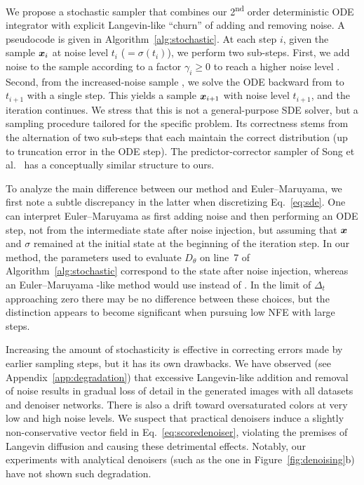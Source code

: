 \documentclass{article}
\begin{document}
We propose a stochastic sampler that combines our 2\textsuperscript{nd} order deterministic ODE integrator with explicit Langevin-like ``churn'' of adding and removing noise.
A pseudocode is given in Algorithm~\ref{alg:stochastic}.
At each step $i$, given the sample $\boldsymbol{x}_i$ at noise level $t_i$ ($=\sigma(t_i)$), we perform two sub-steps.
First, we add noise to the sample according to a factor $\gamma_i\ge0$ to reach a higher noise level .
Second, from the increased-noise sample , we %
solve the ODE backward from  to $t_{i+1}$ with a single step.
This yields a sample $\boldsymbol{x}_{i+1}$ with noise level $t_{i+1}$, and the iteration continues. We stress that this is not a general-purpose SDE solver, but a sampling procedure tailored for the specific problem. Its correctness stems from the alternation of two sub-steps that each maintain the correct distribution (up to truncation error in the ODE step).
{The predictor-corrector sampler of Song et al.~\cite{Song2021sde} has a conceptually similar structure to ours.}

{
To analyze the main difference between our method and Euler--Maruyama, we first note a subtle discrepancy in the latter when discretizing Eq.~\ref{eq:sde}.
One can interpret Euler--Maruyama as first adding noise and then performing an ODE step, not from the intermediate state after noise injection, but assuming that $\boldsymbol{x}$ and $\sigma$ remained at the initial state at the beginning of the iteration step.
In our method, the parameters used to evaluate $D_\theta$ on line~7 of Algorithm~\ref{alg:stochastic} correspond to the state after noise injection, whereas an Euler--Maruyama -like method would use  instead of .
In the limit of $\Delta_t$ approaching zero there may be no difference between these choices, but the distinction appears to become significant when pursuing low NFE with large steps.
}


{Increasing the amount of stochasticity is effective in correcting errors made by earlier sampling steps, but it has its own drawbacks.}
We have observed (see Appendix~{\ref{app:degradation}}) that excessive Langevin-like addition and removal of noise results in gradual loss of detail in the generated images with all datasets and denoiser networks.
There is also a drift toward oversaturated colors at very low and high noise levels.
We suspect that practical denoisers induce a slightly non-conservative vector field in Eq.~\ref{eq:scoredenoiser}, violating the premises of Langevin diffusion and causing these detrimental effects.
Notably, our experiments with analytical denoisers (such as the one in Figure~\ref{fig:denoising}b) have not shown such degradation.
\end{document}

